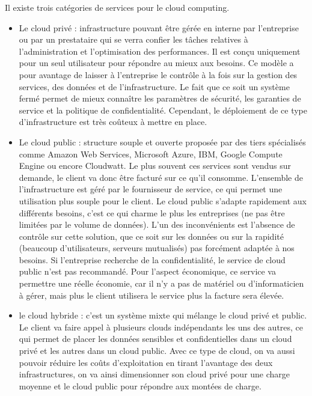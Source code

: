 \documentclass[]{article}
\begin{document}
Il existe trois catégories de services pour le cloud computing.

\begin{itemize}
\item
  Le cloud privé : infrastructure pouvant être gérée en interne par
  l'entreprise ou par un prestataire qui se verra confier les tâches
  relatives à l'administration et l'optimisation des performances. Il
  est conçu uniquement pour un seul utilisateur pour répondre au mieux
  aux besoins. Ce modèle a pour avantage de laisser à l'entreprise le
  contrôle à la fois sur la gestion des services, des données et de
  l'infrastructure. Le fait que ce soit un système fermé permet de mieux
  connaître les paramètres de sécurité, les garanties de service et la
  politique de confidentialité. Cependant, le déploiement de ce type
  d'infrastructure est très coûteux à mettre en place.
\item
  Le cloud public : structure souple et ouverte proposée par des tiers
  spécialisés comme Amazon Web Services, Microsoft Azure, IBM, Google
  Compute Engine ou encore Cloudwatt. Le plus souvent ces services sont
  vendus sur demande, le client va donc être facturé sur ce qu'il
  consomme. L'ensemble de l'infrastructure est géré par le fournisseur
  de service, ce qui permet une utilisation plus souple pour le client.
  Le cloud public s'adapte rapidement aux différents besoins, c'est ce
  qui charme le plus les entreprises (ne pas être limitées par le volume
  de données). L'un des inconvénients est l'absence de contrôle sur
  cette solution, que ce soit sur les données ou sur la rapidité (beaucoup
  d'utilisateurs, serveurs mutualisés) pas forcément adaptée à nos
  besoins. Si l'entreprise recherche de la confidentialité, le service
  de cloud public n'est pas recommandé. Pour l'aspect économique, ce
  service va permettre une réelle économie, car il n'y a pas de matériel
  ou d'informaticien à gérer, mais plus le client utilisera le service
  plus la facture sera élevée.
\item
  le cloud hybride : c'est un système mixte qui mélange le cloud privé et
  public. Le client va faire appel à plusieurs clouds indépendants les
  uns des autres, ce qui permet de placer les données sensibles et
  confidentielles dans un cloud privé et les autres dans un cloud
  public. Avec ce type de cloud, on va aussi pouvoir réduire les coûts
  d'exploitation en tirant l'avantage des deux infrastructures, on va
  ainsi dimensionner son cloud privé pour une charge moyenne et le cloud
  public pour répondre aux montées de charge.
\end{itemize}
\end{document}
